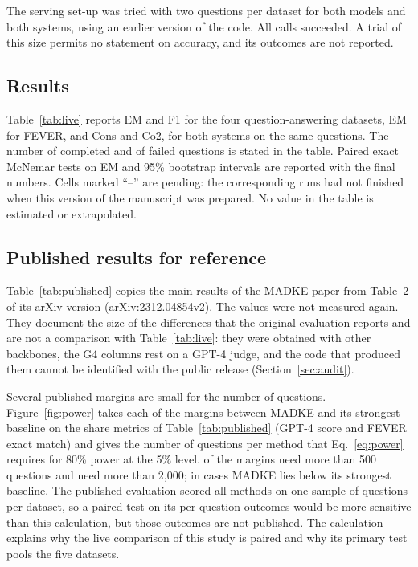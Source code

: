 The serving set-up was tried with two questions per dataset for both models and both systems, using an earlier version of the code. All calls succeeded. A trial of this size permits no statement on accuracy, and its outcomes are not reported.

\subsection{Results}
Table~\ref{tab:live} reports EM and F1 for the four question-answering datasets, EM for FEVER, and Cons and Co2, for both systems on the same questions. The number of completed and of failed questions is stated in the table. Paired exact McNemar tests on EM and 95\% bootstrap intervals are reported with the final numbers. Cells marked ``--'' are pending: the corresponding runs had not finished when this version of the manuscript was prepared. No value in the table is estimated or extrapolated.



\subsection{Published results for reference}
Table~\ref{tab:published} copies the main results of the MADKE paper \cite{wang2025madke} from Table~2 of its arXiv version (arXiv:2312.04854v2). The values were not measured again. They document the size of the differences that the original evaluation reports and are not a comparison with Table~\ref{tab:live}: they were obtained with other backbones, the G4 columns rest on a GPT-4 judge, and the code that produced them cannot be identified with the public release (Section~\ref{sec:audit}).



Several published margins are small for the number of questions. Figure~\ref{fig:power} takes each of the \VPowN{} margins between MADKE and its strongest baseline on the share metrics of Table~\ref{tab:published} (GPT-4 score and FEVER exact match) and gives the number of questions per method that Eq.~\eqref{eq:power} requires for 80\% power at the 5\% level. \VPowOver{} of the \VPowN{} margins need more than 500 questions and \VPowOverTwoK{} need more than 2,000; in \VPowBelow{} cases MADKE lies below its strongest baseline. The published evaluation scored all methods on one sample of questions per dataset, so a paired test on its per-question outcomes would be more sensitive than this calculation, but those outcomes are not published. The calculation explains why the live comparison of this study is paired and why its primary test pools the five datasets.

